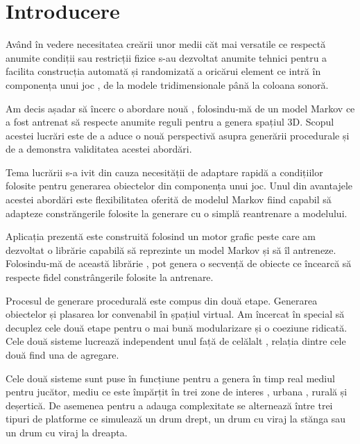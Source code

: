 \chapter*{Introducere} 


Având în vedere necesitatea creării unor medii căt mai versatile ce respectă anumite condiții sau restricții fizice s-au dezvoltat anumite tehnici pentru a facilita construcția automată și randomizată a oricărui element ce intră în componența unui joc , de la modele tridimensionale până la coloana sonoră.\par

Am decis așadar să încerc o abordare nouă , folosindu-mă de un model Markov ce a fost antrenat să respecte anumite reguli pentru a genera spațiul 3D. Scopul acestei lucrări este de a aduce o nouă perspectivă asupra generării procedurale și de a demonstra validitatea acestei abordări.\par

Tema lucrării s-a ivit din cauza necesității de adaptare rapidă a condițiilor folosite pentru generarea obiectelor din componența unui joc. Unul din avantajele acestei abordări este flexibilitatea oferită de modelul Markov fiind capabil să adapteze constrăngerile folosite la generare cu o simplă reantrenare a modelului.\par

Aplicația prezentă este construită folosind un motor grafic peste care am dezvoltat o librărie capabilă să reprezinte un model Markov și să îl antreneze. Folosindu-mă de această librărie , pot genera o secvență de obiecte ce încearcă să respecte fidel constrângerile folosite la antrenare.\par

Procesul de generare procedurală este compus din două etape. Generarea obiectelor și plasarea lor convenabil în șpațiul virtual. Am încercat în special să decuplez cele două etape pentru o mai bună modularizare și o coeziune ridicată. Cele două sisteme lucrează independent unul față de celălalt , relația dintre cele două find una de agregare.

Cele două sisteme sunt puse în funcțiune pentru a genera în timp real mediul pentru jucător, mediu ce este împărțit în trei zone de interes , urbana , rurală și deșertică. De asemenea pentru a adauga complexitate se alternează între trei tipuri de platforme ce simulează un drum drept, un drum cu viraj la stănga sau un drum cu viraj la dreapta.\par